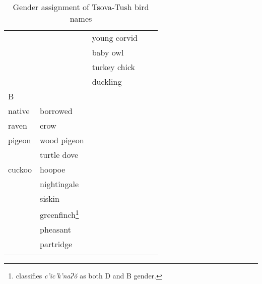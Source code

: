 \begin{table}
\begin{tabular}{lllll}
	& & young corvid & & \\
	& & baby owl & & \\
	& & turkey chick & & \\
	& & duckling & & \\
	\midrule
	B & \\
	native & {borrowed} \\
	\midrule
	raven  & crow \\
    pigeon & wood pigeon \\
           & turtle dove \\
    cuckoo & hoopoe \\
           & nightingale \\
           & siskin \\
           & greenfinch\footnote{\cite{kadkad84} classifies \textit{c'ic'k'naɁ\u{o}} as both D and B gender.} \\ 
           & pheasant \\
           & partridge \\
	\lspbottomrule
	\end{tabular}	
	\caption{Gender assignment of Tsova-Tush bird names}
	\label{table-birdass}
\end{table}

